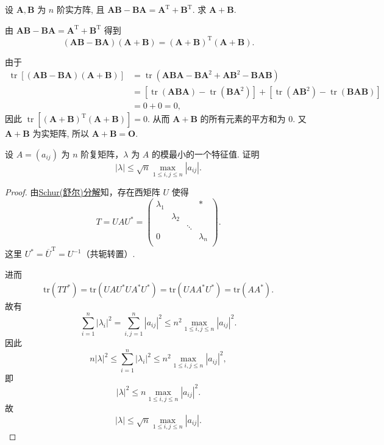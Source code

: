 \documentclass[../../main.tex]{subfiles}
\begin{document}
\begin{example}
设 $\boldsymbol{A}, \boldsymbol{B}$ 为 $n$ 阶实方阵, 且 $\boldsymbol{AB} - \boldsymbol{BA} = \boldsymbol{A}^{\mathrm{T}} + \boldsymbol{B}^{\mathrm{T}}$. 求 $\boldsymbol{A} + \boldsymbol{B}$.
\end{example}
\begin{solution}
由 $\boldsymbol{AB} - \boldsymbol{BA} = \boldsymbol{A}^{\mathrm{T}} + \boldsymbol{B}^{\mathrm{T}}$ 得到
$$
(\boldsymbol{AB} - \boldsymbol{BA})(\boldsymbol{A} + \boldsymbol{B}) = (\boldsymbol{A} + \boldsymbol{B})^{\mathrm{T}}(\boldsymbol{A} + \boldsymbol{B}).
$$

由于
$$
\begin{aligned}
\operatorname{tr}\left[(\boldsymbol{AB} - \boldsymbol{BA})(\boldsymbol{A} + \boldsymbol{B})\right] &= \operatorname{tr}\left(\boldsymbol{ABA} - \boldsymbol{BA}^2 + \boldsymbol{AB}^2 - \boldsymbol{BAB}\right) \\
&= \left[\operatorname{tr}\left(\boldsymbol{ABA}\right) - \operatorname{tr}\left(\boldsymbol{BA}^2\right)\right] + \left[\operatorname{tr}\left(\boldsymbol{AB}^2\right) - \operatorname{tr}\left(\boldsymbol{BAB}\right)\right] \\
&= 0 + 0 = 0,
\end{aligned}
$$
因此 $\operatorname{tr}\left[(\boldsymbol{A} + \boldsymbol{B})^{\mathrm{T}}(\boldsymbol{A} + \boldsymbol{B})\right] = 0$. 从而 $\boldsymbol{A} + \boldsymbol{B}$ 的所有元素的平方和为 $0$. 又 $\boldsymbol{A} + \boldsymbol{B}$ 为实矩阵, 所以 $\boldsymbol{A} + \boldsymbol{B} = \boldsymbol{O}$.
\end{solution}

\begin{example}
设 \( A = (a_{ij}) \) 为 \( n \) 阶复矩阵，\( \lambda \) 为 \( A \) 的模最小的一个特征值. 证明
\[
|\lambda| \leqslant \sqrt{n} \max_{1 \leqslant i,j \leqslant n} |a_{ij}|.
\]
\end{example}
\begin{proof}
由\hyperref[theorem:Schur(舒尔)定理]{Schur(舒尔)分解}知，存在西矩阵 \( U \) 使得
\[
T = UAU^* = \left( \begin{matrix}
\lambda _1&		&		&		*\\
&		\lambda _2&		&		\\
&		&		\ddots&		\\
0&		&		&		\lambda _n\\
\end{matrix} \right) .
\]
这里 \( U^* = \overline{U}^\mathrm{T} =U^{-1}\)（共轭转置）.

进而
\begin{align*}
\mathrm{tr}(TT^*)= \mathrm{tr}(UAU^*UA^*U^*)= \mathrm{tr}(UAA^*U^*) = \mathrm{tr}(AA^*).
\end{align*}
故有
\[
\sum_{i=1}^n |\lambda_i|^2 = \sum_{i,j=1}^n |a_{ij}|^2 \leqslant n^2 \max_{1 \leqslant i,j \leqslant n} |a_{ij}|^2.
\]
因此
\[
n|\lambda|^2 \leqslant \sum_{i=1}^n |\lambda_i|^2 \leqslant n^2 \max_{1 \leqslant i,j \leqslant n} |a_{ij}|^2,
\]
即
\[
|\lambda|^2 \leqslant n \max_{1 \leqslant i,j \leqslant n} |a_{ij}|^2.
\]
故
\[
|\lambda| \leqslant \sqrt{n} \max_{1 \leqslant i,j \leqslant n} |a_{ij}|.
\]
\end{proof}
\end{document}
